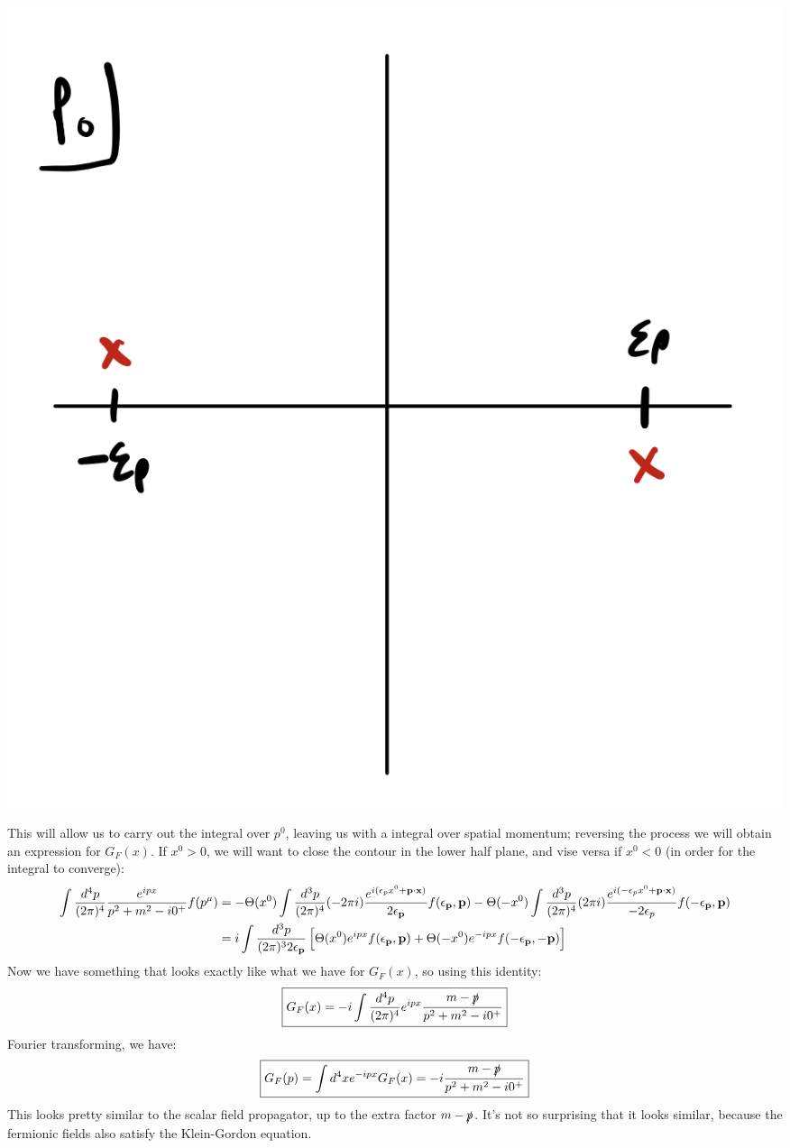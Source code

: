 \begin{center}
    \includegraphics[scale=0.3]{Lectures/Images/lec5-p0poles.png}
\end{center}

This will allow us to carry out the integral over $p^0$, leaving us with a integral over spatial momentum; reversing the process we will obtain an expression for $G_F(x)$. If $x^0 > 0$, we will want to close the contour in the lower half plane, and vise versa if $x^0 < 0$ (in order for the integral to converge):
\begin{equation}
    \begin{split}
        \int \frac{d^4p}{(2\pi)^4}\frac{e^{ipx}}{p^2 + m^2 - i0^+}f(p^\mu) &= -\Theta(x^0)\int \frac{d^3p}{(2\pi)^4}(-2\pi i)\frac{e^{i(\epsilon_p x^0 + \mathbf{p} \cdot \mathbf{x})}}{2\epsilon_{\mathbf{p}}}f(\epsilon_{\mathbf{p}}, \mathbf{p}) - \Theta(-x^0)\int \frac{d^3p}{(2\pi)^4}(2\pi i)\frac{e^{i(-\epsilon_p x^0 + \mathbf{p} \cdot \mathbf{x})}}{-2\epsilon_p}f(-\epsilon_{\mathbf{p}}, \mathbf{p})
        \\ &= i\int \frac{d^3p}{(2\pi)^32\epsilon_{\mathbf{p}}}\left[\Theta(x^0)e^{ipx}f(\epsilon_{\mathbf{p}}, \mathbf{p}) + \Theta(-x^0)e^{-ipx}f(-\epsilon_{\mathbf{p}}, -\mathbf{p})\right]
    \end{split}
\end{equation}
Now we have something that looks exactly like what we have for $G_F(x)$, so using this identity:
\begin{equation}
    \boxed{G_F(x) = -i\int \frac{d^4p}{(2\pi)^4}e^{ipx}\frac{m-\slashed{p}}{p^2 + m^2 - i0^+}}
\end{equation}
Fourier transforming, we have:
\begin{equation}
    \boxed{G_F(p) = \int d^4x e^{-ipx}G_F(x) = -i\frac{m-\slashed{p}}{p^2 + m^2 - i0^+}}
\end{equation}
This looks pretty similar to the scalar field propagator, up to the extra factor $m - \slashed{p}$. It's not so surprising that it looks similar, because the fermionic fields also satisfy the Klein-Gordon equation.

